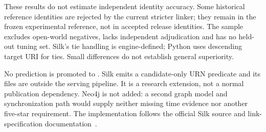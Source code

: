 These results do not estimate independent identity accuracy. Some historical
reference identities are rejected by the current stricter linker; they remain
in the frozen experimental reference, not in accepted release identities.
The sample excludes open-world negatives, lacks independent adjudication and
has no held-out tuning set. Silk's tie handling is engine-defined; Python uses
descending target URI for ties. Small differences do not establish general superiority.

No prediction is promoted to . Silk emits a candidate-only URN
predicate and its files are outside the serving pipeline. It is a research extension,
not a normal publication dependency. Neo4j is not added: a second graph model and
synchronization path would supply neither missing time evidence nor another
five-star requirement. The implementation follows the official Silk source and
link-specification documentation~\cite{silk}.
